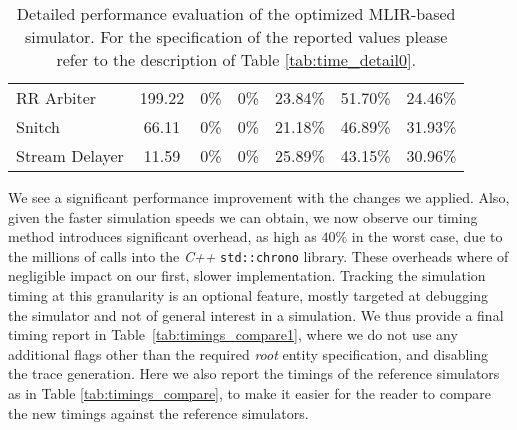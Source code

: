\begin{table}[ht]
{\begin{tabular}{lcccccc}
      RR Arbiter      & 199.22             & 0\%                        & 0\%                        & 23.84\%                    & 51.70\%                    & 24.46\%            \\
      Snitch          & 66.11              & 0\%                        & 0\%                        & 21.18\%                    & 46.89\%                    & 31.93\%            \\
      Stream Delayer  & 11.59              & 0\%                        & 0\%                        & 25.89\%                    & 43.15\%                    & 30.96\%            \\
      \bottomrule
    \end{tabular}
  }
  \caption[Detailed performance evaluation of the optimized MLIR-based simulator.]{Detailed performance evaluation of the optimized MLIR-based simulator. For the specification of the reported values please refer to the description of Table \ref{tab:time_detail0}.}
  \label{tab:time_detail1}
\end{table}

We see a significant performance improvement with the changes we applied. Also, given the faster simulation speeds we can obtain, we now observe our timing method introduces significant overhead, as high as $40\%$ in the worst case, due to the millions of calls into the \textit{C++} \texttt{std::chrono} library. These overheads where of negligible impact on our first, slower implementation. Tracking the simulation timing at this granularity is an optional feature, mostly targeted at debugging the simulator and not of general interest in a simulation. We thus provide a final timing report in Table~\ref{tab:timings_compare1}, where we do not use any additional flags other than the required \textit{root} entity specification, and disabling the trace generation. Here we also report the timings of the reference simulators as in Table \ref{tab:timings_compare}, to make it easier for the reader to compare the new timings against the reference simulators.


